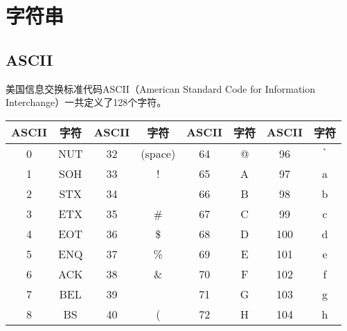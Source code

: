 \section{字符串}

\subsection{ASCII}

美国信息交换标准代码ASCII（American Standard Code for Information Interchange）一共定义了128个字符。\\

\begin{longtable}{|c|c|c|c|c|c|c|c|}
	\hline
	\textbf{ASCII} & \textbf{字符} & \textbf{ASCII} & \textbf{字符} & \textbf{ASCII} & \textbf{字符}          & \textbf{ASCII} & \textbf{字符}          \\
	\hline
	0              & NUT           & 32             & (space)       & 64             & @                      & 96             & \lstinline|`| \\
	\hline
	1              & SOH           & 33             & !             & 65             & A                      & 97             & a                      \\
	\hline
	2              & STX           & 34             & \text{"}      & 66             & B                      & 98             & b                      \\
	\hline
	3              & ETX           & 35             & \#            & 67             & C                      & 99             & c                      \\
	\hline
	4              & EOT           & 36             & \$            & 68             & D                      & 100            & d                      \\
	\hline
	5              & ENQ           & 37             & \%            & 69             & E                      & 101            & e                      \\
	\hline
	6              & ACK           & 38             & \&            & 70             & F                      & 102            & f                      \\
	\hline
	7              & BEL           & 39             & \text{'}      & 71             & G                      & 103            & g                      \\
	\hline
	8              & BS            & 40             & (             & 72             & H                      & 104            & h                      \\

\end{longtable}
